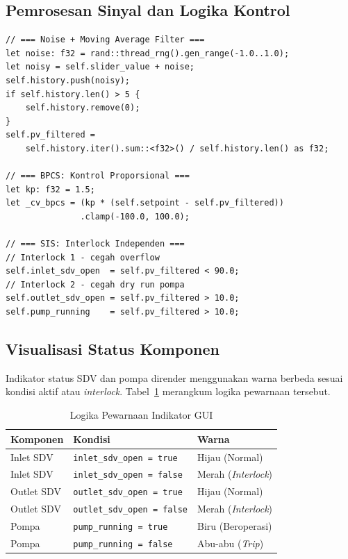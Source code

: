 \documentclass[12pt,a4paper]{article}
\begin{document}
\subsection{Pemrosesan Sinyal dan Logika Kontrol}
\begin{lstlisting}[caption={Noise filter, BPCS, dan SIS interlock}]
// === Noise + Moving Average Filter ===
let noise: f32 = rand::thread_rng().gen_range(-1.0..1.0);
let noisy = self.slider_value + noise;
self.history.push(noisy);
if self.history.len() > 5 {
    self.history.remove(0);
}
self.pv_filtered =
    self.history.iter().sum::<f32>() / self.history.len() as f32;

// === BPCS: Kontrol Proporsional ===
let kp: f32 = 1.5;
let _cv_bpcs = (kp * (self.setpoint - self.pv_filtered))
               .clamp(-100.0, 100.0);

// === SIS: Interlock Independen ===
// Interlock 1 - cegah overflow
self.inlet_sdv_open  = self.pv_filtered < 90.0;
// Interlock 2 - cegah dry run pompa
self.outlet_sdv_open = self.pv_filtered > 10.0;
self.pump_running    = self.pv_filtered > 10.0;
\end{lstlisting}

\subsection{Visualisasi Status Komponen}
Indikator status SDV dan pompa dirender menggunakan warna berbeda sesuai
kondisi aktif atau \textit{interlock}. Tabel~\ref{tab:warna} merangkum
logika pewarnaan tersebut.

\begin{table}[H]
\centering
\caption{Logika Pewarnaan Indikator GUI}
\label{tab:warna}
\begin{tabular}{l l l}
\toprule
\textbf{Komponen}  & \textbf{Kondisi}                      & \textbf{Warna} \\
\midrule
Inlet SDV  & \texttt{inlet\_sdv\_open = true}    & Hijau (Normal) \\
Inlet SDV  & \texttt{inlet\_sdv\_open = false}   & Merah (\textit{Interlock}) \\
Outlet SDV & \texttt{outlet\_sdv\_open = true}   & Hijau (Normal) \\
Outlet SDV & \texttt{outlet\_sdv\_open = false}  & Merah (\textit{Interlock}) \\
Pompa      & \texttt{pump\_running = true}       & Biru (Beroperasi) \\
Pompa      & \texttt{pump\_running = false}      & Abu-abu (\textit{Trip}) \\
\bottomrule
\end{tabular}
\end{table}
\end{document}
